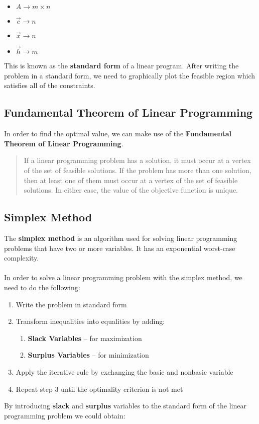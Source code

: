 \documentclass{article}
\begin{document}
\begin{itemize}
	\item $A \rightarrow m \times n$
	\item $\overrightarrow{c} \rightarrow n$
	\item $\overrightarrow{x} \rightarrow n$
	\item $\overrightarrow{h} \rightarrow m$
\end{itemize}
This is known as the \textbf{standard form} of a linear program. After writing the problem in a standard form, we need to graphically plot the feasible region which satisfies all of the constraints.

\subsection{Fundamental Theorem of Linear Programming}
In order to find the optimal value, we can make use of the \textbf{Fundamental Theorem of Linear Programming}.

\blockquote{
If a linear programming problem has a solution, it must occur at a vertex of the set of feasible solutions. If the problem has more than one solution, then at least one of them must occur at a vertex of the set of feasible solutions. In either case, the value of the objective function is unique.
}

\subsection{Simplex Method}
The \textbf{simplex method} is an algorithm used for solving linear programming problems that have two or more variables. It has an exponential worst-case complexity. \\ \\
In order to solve a linear programming problem with the simplex method, we need to do the following:

\begin{enumerate}
	\item Write the problem in standard form
	\item Transform inequalities into equalities by adding:
	\begin{enumerate}
		\item \textbf{Slack Variables} -- for maximization
		\item \textbf{Surplus Variables} -- for minimization
	\end{enumerate}
	\item Apply the iterative rule by exchanging the basic and nonbasic variable
	\item Repeat step 3 until the optimality criterion is not met
\end{enumerate}
By introducing \textbf{slack} and \textbf{surplus} variables to the standard form of the linear programming problem we could obtain:
\end{document}
